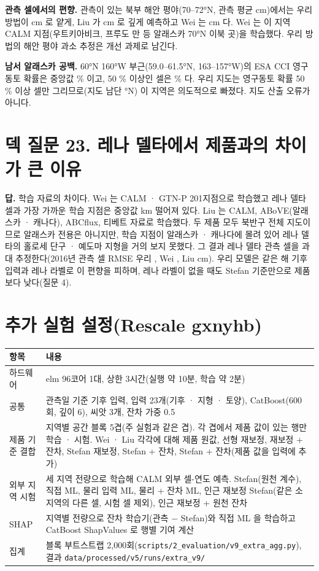 \documentclass[10pt]{article}
\begin{document}
\textbf{관측 셀에서의 편향.} 관측이 있는 북부 해안 평야(70--72°N, 관측 평균 \nbiasobsAkNorth{} cm)에서는 우리 방법이 \nbiasAkNorthRo{} cm 로 얕게, Liu 가 \nbiasAkNorthLiu{} cm 로 깊게 예측하고 Wei 는 \nbiasAkNorthWei{} cm 다. Wei 는 이 지역 CALM 지점(우트키아비크, 프루도 만 등 알래스카 70°N 이북 \nweisitesAkN{}곳)을 학습했다. 우리 방법의 해안 평야 과소 추정은 개선 과제로 남긴다.

\textbf{남서 알래스카 공백.} 60°N 160°W 부근(59.0--61.5°N, 163--157°W)의 ESA CCI 영구동토 확률은 중앙값 \nswpfrmed{} \% 이고, 50 \% 이상인 셀은 \nswpfrge{} \% 다. 우리 지도는 영구동토 확률 50 \% 이상 셀만 그리므로(지도 남단 \nmaplatmin°N) 이 지역은 의도적으로 빠졌다. 지도 산출 오류가 아니다.

\section{덱 질문 23. 레나 델타에서 제품과의 차이가 큰 이유}
\textbf{답.} 학습 자료의 차이다. Wei 는 CALM · GTN-P 201지점으로 학습했고 레나 델타 셀과 가장 가까운 학습 지점은 중앙값 \ndistweiLemed{} km 떨어져 있다. Liu 는 CALM, ABoVE(알래스카 · 캐나다), ABCflux, 티베트 자료로 학습했다. 두 제품 모두 북반구 전체 지도이므로 알래스카 전용은 아니지만, 학습 지점이 알래스카 · 캐나다에 몰려 있어 레나 델타의 홀로세 단구 · 예도마 지형을 거의 보지 못했다. 그 결과 레나 델타 관측 셀을 과대 추정한다(2016년 관측 셀 RMSE 우리 \nfeLeOurs, Wei \nfeLeWei, Liu \nfeLeLiu{} cm). 우리 모델은 같은 해 기후 입력과 레나 라벨로 이 편향을 피하며, 레나 라벨이 없을 때도 Stefan 기준만으로 제품보다 낮다(질문 4).

\appendix
\section{추가 실험 설정(Rescale gxnyhb)}
\small
\begin{tabularx}{\textwidth}{>{\raggedright\arraybackslash}p{}Y}
\toprule
항목 & 내용 \\ \midrule
하드웨어 & elm 96코어 1대, 상한 3시간(실행 약 10분, 학습 약 2분) \\
공통 & 관측일 기준 기후 입력, 입력 23개(기후 · 지형 · 토양), CatBoost(600회, 깊이 6), 씨앗 3개, 잔차 가중 0.5 \\
제품 기준 결합 & 지역별 공간 블록 5겹(주 실험과 같은 겹). 각 겹에서 제품 값이 있는 행만 학습 · 시험. Wei · Liu 각각에 대해 제품 원값, 선형 재보정, 재보정 + 잔차, Stefan 재보정, Stefan + 잔차, Stefan + 잔차(제품 값을 입력에 추가) \\
외부 지역 시험 & 세 지역 전량으로 학습해 CALM 외부 셀-연도 예측. Stefan(원천 계수), 직접 ML, 물리 입력 ML, 물리 + 잔차 ML, 인근 재보정 Stefan(같은 소지역의 다른 셀, 시험 셀 제외), 인근 재보정 + 원천 잔차 \\
SHAP & 지역별 전량으로 잔차 학습기(관측 − Stefan)와 직접 ML 을 학습하고 CatBoost ShapValues 로 행별 기여 계산 \\
집계 & 블록 부트스트랩 2,000회(\texttt{scripts/2\_evaluation/v9\_extra\_agg.py}), 결과 \texttt{data/processed/v5/runs/extra\_v9/} \\
\bottomrule
\end{tabularx}
\normalsize
\end{document}
